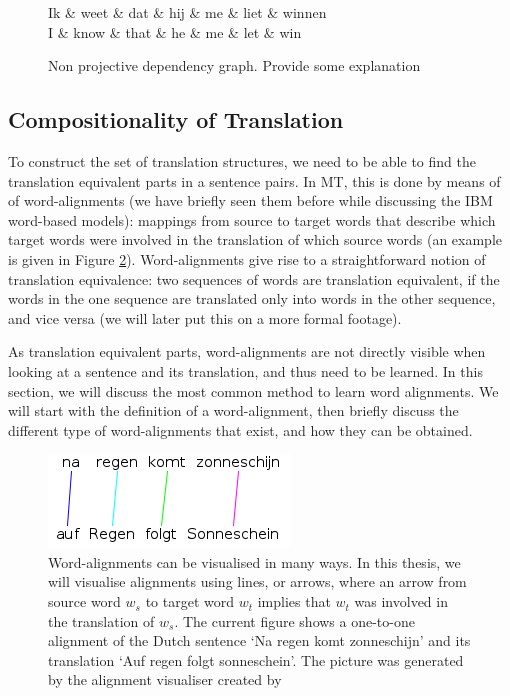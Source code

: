 \documentclass{report}
\theoremstyle{break}
\begin{document}
\begin{figure}[!ht]
\centering
\begin{dependency}[theme=simple]%
\begin{deptext}[column sep=.5cm, row sep=.1ex]
Ik \& weet \& dat \& hij \& me \& liet \& winnen\\
\tiny{I} \& \tiny{know} \& \tiny{that} \& \tiny{he} \& \tiny{me} \& \tiny{let} \& \tiny{win}\\
\end{deptext}
\end{dependency}
\caption{Non projective dependency graph. Provide some explanation}\label{fig:npdeptree}
\end{figure}

\subsection{Compositionality of Translation}
\label{sec:alignments}

To construct the set of translation structures, we need to be able to find the translation equivalent parts in a sentence pairs. In MT, this is done by means of of word-alignments (we have briefly seen them before while discussing the IBM word-based models): mappings from source to target words that describe which target words were involved in the translation of which source words (an example is given in Figure \ref{fig:alignment}). Word-alignments give rise to a straightforward notion of translation equivalence: two sequences of words are translation equivalent, if the words in the one sequence are translated only into words in the other sequence, and vice versa (we will later put this on a more formal footage).

As translation equivalent parts, word-alignments are not directly visible when looking at a sentence and its translation, and thus need to be learned. In this section, we will discuss the most common method to learn word alignments. We will start with the definition of a word-alignment, then briefly discuss the different type of word-alignments that exist, and how they can be obtained.

\begin{figure}[!ht]
\centering
\includegraphics[scale=0.6]{alignment.png}
\caption{Word-alignments can be visualised in many ways. In this thesis, we will visualise alignments using lines, or arrows, where an arrow from source word $w_s$ to target word $w_t$ implies that $w_t$ was involved in the translation of $w_s$. The current figure shows a one-to-one alignment of the Dutch sentence `Na regen komt zonneschijn' and its translation `Auf regen folgt sonneschein'. The picture was generated by the alignment visualiser created by \cite{maillette2010visualizing}}
\label{fig:alignment}
\end{figure}
\end{document}
